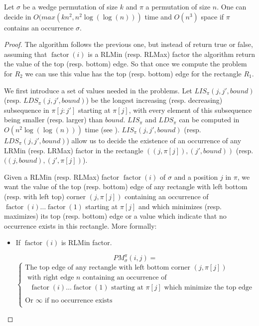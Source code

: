 \documentclass[a4paper]{llncs}
\newcommand{\ptext}{\pi}
\newcounter{num}
\newcommand{\PM}{PM}
\DeclareMathOperator{\factor}{factor}
\begin{document}
\begin{proposition}
\label{Proposition:sigma avoids 213 and 231}
Let $\sigma$ be a wedge permutation of size $k$
and $\pi$ a permutation of size $n$.
One can decide in $O(max(kn^2,n^2\log(\log(n)))$ time
and $O(n^3)$ space if $\pi$ contains an occurrence $\sigma$.
\end{proposition}


\begin{proof}
The algorithm follows the previous one,
but instead of return true or false,
assuming that $\factor(i)$ is a RLMin (resp. RLMax) factor
the algorithm return the value of the
top (resp. bottom) edge.
So that once we compute the problem for $R_2$
we can use this value has the top (resp. bottom) edge
for the rectangle $R_1$.

We first introduce a set of values needed in the problems.
Let $LIS_{\ptext}(j,j',bound)$ (resp. $LDS_{\ptext}(j,j',bound)$) be the longest increasing
(resp. decreasing) subsequence in $\ptext[j:j']$ starting at $\pi[j]$,
with every element of this subsequence being
smaller (resp. larger) than $bound$.
$LIS_{\ptext}$ and $LDS_{\ptext}$ can be computed in
$O(n^2\log(\log(n)))$ time (see \cite{Bespamyatnikh00enumeratinglongest}).
$LIS_{\ptext}(j,j',bound)$
(resp. $LDS_{\ptext}(j,j',bound)$)
allow us to decide
the existence of an occurrence of any LRMin (resp. LRMax) factor
in the rectangle $((j,\pi[j]),(j',bound))$ (resp. $((j,bound),(j',\pi[j])$).

Given a RLMin (resp. RLMax) factor $\factor(i)$  of $\sigma$ and a position $j$ in $\pi$,
we want the value of the top (resp. bottom) edge
of any rectangle with left bottom (resp. with left top) corner   $(j,\pi[j])$  containing an occurrence of  $\factor(i) \ldots \factor(1)$ starting at $\pi[j]$
and which minimizes (resp. maximizes) its top (resp. bottom) edge
or a value which indicate that no occurrence exists in this rectangle. More formally:
\begin{itemize}
\item If $\factor(i)$ is RLMin factor.

$$
\PM^\pi_\sigma(i,j) =
$$
$$
\begin{cases}

	\text{The top edge of any rectangle with left bottom corner   $(j,\pi[j])$} \\
	\text{ with right edge  $n$ containing an occurrence of  } \\
	\text{ $\factor(i) \ldots \factor(1)$ starting at $\pi[j]$ which minimize the top edge}  \\
	\text{ } \\
	\text{Or $\infty$ if no occurrence exists} \text{} \\
\end{cases}
$$


\end{itemize}
\end{proof}
\end{document}
